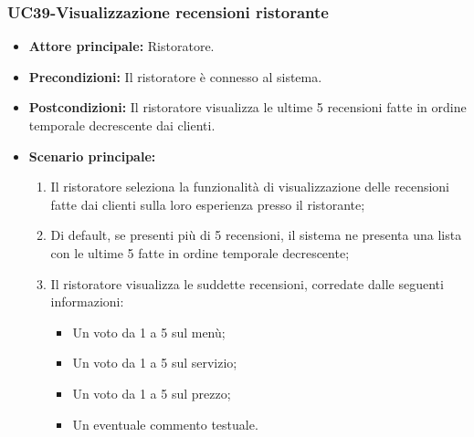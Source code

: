 \subsubsection{UC39-Visualizzazione recensioni ristorante}
\begin{itemize}
\item \textbf{Attore principale:} Ristoratore.
\item \textbf{Precondizioni:} Il ristoratore è connesso al sistema.
\item \textbf{Postcondizioni:} Il ristoratore visualizza le ultime 5 recensioni fatte in ordine temporale decrescente dai clienti.
\item \textbf{Scenario principale:}
\begin{enumerate}
    \item Il ristoratore seleziona la funzionalità di visualizzazione delle recensioni fatte dai clienti sulla loro esperienza presso il ristorante;
    \item Di default, se presenti più di 5 recensioni, il sistema ne presenta una lista con le ultime 5 fatte in ordine temporale decrescente;
    \item Il ristoratore visualizza le suddette recensioni, corredate dalle seguenti informazioni:
    \begin{itemize}
        \item Un voto da 1 a 5 sul menù;
        \item Un voto da 1 a 5 sul servizio;
        \item Un voto da 1 a 5 sul prezzo;
        \item Un eventuale commento testuale.
    \end{itemize}
\end{enumerate}
\end{itemize}

